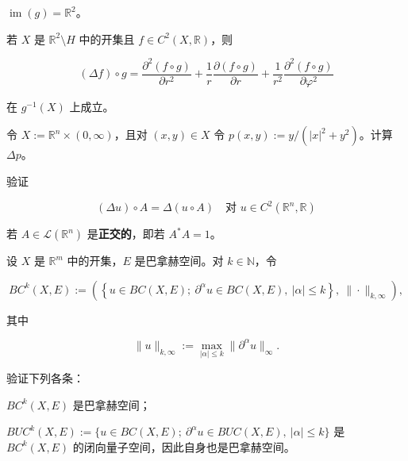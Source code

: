 \begin{exercises}
\begin{items}
$ \operatorname{im}(g) = \mathbb{R}^{2} $。

\item

若 $ X $ 是 $ \mathbb{R}^{2} \setminus H $ 中的开集且 $ f \in C^{2}(X, \mathbb{R}) $，则

\[
(\Delta f) \circ g = \frac{\partial^{2}(f \circ g)}{\partial r^{2}} + \frac{1}{r}\frac{\partial(f \circ g)}{\partial r} + \frac{1}{r^{2}}\frac{\partial^{2}(f \circ g)}{\partial \varphi^{2}}
\]

在 $ g^{-1}(X) $ 上成立。

\end{items}

\item

令 $ X := \mathbb{R}^{n} \times (0, \infty) $，且对 $ (x, y) \in X $ 令 $ p(x, y) := y/(|x|^{2} + y^{2}) $。计算 $ \Delta p $。

\item

验证

\[
(\Delta u) \circ A = \Delta(u \circ A) \quad \text{对 } u \in C^{2}(\mathbb{R}^{n}, \mathbb{R})
\]

若 $ A \in \mathcal{L}(\mathbb{R}^{n}) $ 是\textbf{正交的}，即若 $ A^{*}A = 1 $。

\item

设 $ X $ 是 $ \mathbb{R}^{m} $ 中的开集，$ E $ 是巴拿赫空间。对 $ k \in \mathbb{N} $，令

\[
BC^{k}(X, E) := \left( \left\{ u \in BC(X, E) ; \ \partial^{\alpha}u \in BC(X, E), \ |\alpha| \le k \right\}, \ \|\cdot\|_{k,\infty} \right) ,
\]

其中

\[
\|u\|_{k,\infty} := \max_{|\alpha| \le k}\|\partial^{\alpha}u\|_{\infty} .
\]

验证下列各条：

\begin{items}
\item

$ BC^{k}(X, E) $ 是巴拿赫空间；

\item

$ BUC^{k}(X, E) := \{u \in BC(X, E) ; \ \partial^{\alpha}u \in BUC(X, E), \ |\alpha| \le k\} $ 是 $ BC^{k}(X, E) $ 的闭向量子空间，因此自身也是巴拿赫空间。

\end{items}

\item


\end{exercises}
